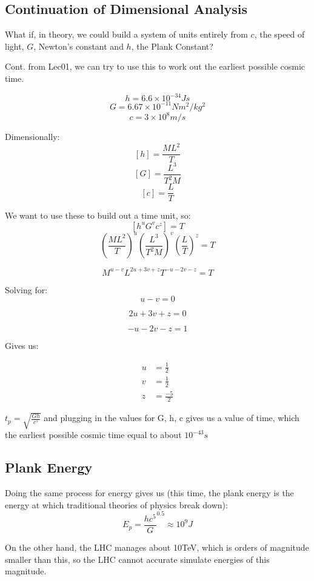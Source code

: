 \subsection*{Continuation of Dimensional Analysis}
What if, in theory, we could build a system of units entirely from $c$, the speed of light, $G$, Newton's constant and $h$, the Plank Constant?

Cont. from Lec01, we can try to use this to work out the earliest possible cosmic time.

\[
    h = 6.6 \times 10^{-34}Js
\]
\[
    G = 6.67 \times 10^{-11} N m^2 / kg^2
\]
\[
    c = 3 \times 10^8 m/s
\]

Dimensionally:
\[
    [h] = \frac{ML^2}{T}
\]
\[
    [G] = \frac{L^3}{T^2 M}
\]
\[
    [c] = \frac{L}{T}
\]

We want to use these to build out a time unit, so:
\[
    [h^u G^v c^z] = T
\]
\[
    \left(\frac{ML^2}{T}\right)^u \left(\frac{L^3}{T^2 M}\right)^v \left(\frac{L}{T}\right)^z = T
\]

\[
    M^{u-v} L^{2u + 3v + z} T^{-u - 2v -z} = T
\]

Solving for:
\[
    u-v = 0
\]

\[
    2u+3v + z = 0
\]

\[
    -u - 2v - z = 1
\]

Gives us:

\begin{align}
    u &= \frac{1}{2}\\
    v &= \frac{1}{2}\\
    z &= \frac{-5}{2}
\end{align}

$t_p = \sqrt{\frac{Gh}{c^5}}$ and plugging in the values for G, h, c gives us a value of time, which the earliest possible cosmic time equal to about $10^{-43}s$


\subsection*{Plank Energy}
Doing the same process for energy gives us (this time, the plank energy is the energy at which traditional theories of physics break down):
\[
    E_p = \frac{hc^5}{G}^{0.5} \approx 10^9 J
\]

On the other hand, the LHC manages about 10TeV, which is orders of magnitude smaller than this, so the LHC cannot accurate simulate energies of this magnitude.

